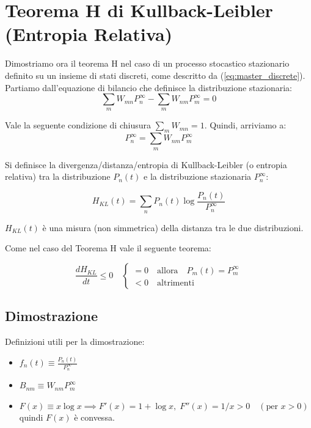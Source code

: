 \section{Teorema H di Kullback-Leibler (Entropia Relativa)}
Dimostriamo ora il teorema H nel caso di un processo stocastico stazionario definito su un insieme di stati discreti, come descritto da (\ref{eq:master_discrete}). Partiamo dall'equazione di bilancio che definisce la distribuzione stazionaria:
\begin{equation}
\sum_m W_{mn} P_n^{\infty} -\sum_m W_{nm} P_m^{\infty} =0
\end{equation}

Vale la seguente condizione di chiusura $\sum_m W_{mn} = 1$. Quindi, arriviamo a:
\begin{equation}
P_n^\infty = \sum_m W_{nm} P_m^\infty
\end{equation}

Si definisce la divergenza/distanza/entropia di Kullback-Leibler (o entropia relativa) tra la distribuzione $P_n(t)$ e la distribuzione stazionaria $P_n^{\infty}$:
\begin{tcolorbox}[
    colback=colorA!5,      
    colframe=colorA,       
    arc=3mm,               
    boxrule=1.2pt
]
\begin{equation}
H_{KL}(t) = \sum_n P_n(t) \log \frac{P_n(t)}{P_n^{\infty}}
\end{equation}
\end{tcolorbox}
$H_{KL}(t)$ è una misura (non simmetrica) della distanza tra le due distribuzioni.

Come nel caso del Teorema H vale il seguente teorema:
\begin{tcolorbox}[
    colback=colorA!5,      
    colframe=colorA,       
    arc=3mm,               
    boxrule=1.2pt
]
\begin{equation}
\frac{dH_{KL}}{dt} \leq 0 \quad \begin{cases} =0 \quad \text{allora} \quad  P_m(t) = P_m^\infty\\ <0 \quad \text{altrimenti} \quad\end{cases}
\end{equation}
\end{tcolorbox}

\subsection{Dimostrazione}
Definizioni utili per la dimostrazione:
\begin{itemize}
    \item $f_n(t) \equiv \frac{P_n(t)}{P_n^{\infty}}$
    \item $B_{nm} \equiv W_{nm}P_m^{\infty}$
    \item $F(x) \equiv x \log x \implies F'(x) = 1 + \log x, \; F''(x) = 1/x > 0 \quad (\text{per } x>0)$ quindi $F(x)$ è convessa.
\end{itemize}

